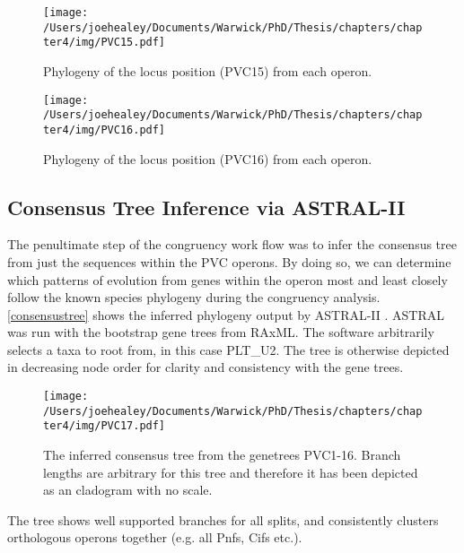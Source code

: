 \newpage
\begin{figure}[h!]
	\centering
	\texttt{[image: /Users/joehealey/Documents/Warwick/PhD/Thesis/chapters/chapter4/img/PVC15.pdf]}
	\captionsetup{singlelinecheck=off, justification=justified, font=footnotesize, aboveskip=19pt}
	\caption{Phylogeny of the locus position (PVC15) from each operon.}
	\label{pvc15tree}
\end{figure}
\hfill
\begin{figure}[h!]
	\centering
	\texttt{[image: /Users/joehealey/Documents/Warwick/PhD/Thesis/chapters/chapter4/img/PVC16.pdf]}
	\captionsetup{singlelinecheck=off, justification=justified, font=footnotesize, aboveskip=19pt}
	\caption{Phylogeny of the locus position (PVC16) from each operon.}
	\label{pvc16tree}
\end{figure}

\newpage

\subsection{Consensus Tree Inference via ASTRAL-II}
The penultimate step of the congruency work flow was to infer the consensus tree from just the sequences within the PVC operons. By doing so, we can determine which patterns of evolution from genes within the operon most and least closely follow the known species phylogeny during the congruency analysis. \vref{consensustree} shows the inferred phylogeny output by ASTRAL-II \citep{Mirarab2015}. ASTRAL was run with the bootstrap gene trees from RAxML. The software arbitrarily selects a taxa to root from, in this case PLT\_U2. The tree is otherwise depicted in decreasing node order for clarity and consistency with the gene trees.

\vspace{1cm}
\begin{figure}[h!]
	\centering
	\texttt{[image: /Users/joehealey/Documents/Warwick/PhD/Thesis/chapters/chapter4/img/PVC17.pdf]}
	\captionsetup{singlelinecheck=off, justification=justified, font=footnotesize, aboveskip=19pt}
	\caption[Consensus Tree]{The inferred consensus tree from the genetrees PVC1-16. Branch lengths are arbitrary for this tree and therefore it has been depicted as an cladogram with no scale.}
	\label{consensustree}
\end{figure}

The tree shows well supported branches for all splits, and consistently clusters orthologous operons together (e.g. all Pnfs, Cifs etc.).


